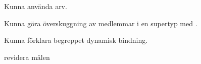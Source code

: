 
\item Kunna använda arv.
\item Kunna göra överskuggning av medlemmar i en supertyp med .
\item Kunna förklara begreppet dynamisk bindning.
\item \TODO revidera målen
